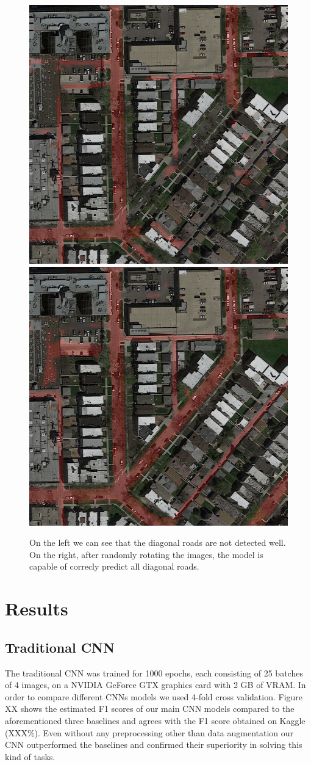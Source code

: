 \documentclass[10pt,conference,compsocconf]{IEEEtran}
\begin{document}
\begin{figure}[h]
 \centering
 \includegraphics[width=0.35\columnwidth]{img/diagonals.png}
 \includegraphics[width=0.35\columnwidth]{img/diagonals_corrected.png}
 \caption{On the left we can see that the diagonal roads are not detected well. On the right, after randomly rotating the images, the model is capable of correcly predict all diagonal roads.}
 \vspace{-3mm}
 \label{fig:diagonal}
\end{figure}

\section{Results}
\label{sec:results}
\subsection{Traditional CNN}
	The traditional CNN was trained for 1000 epochs, each consisting of 25 batches of 4 images, on a NVIDIA GeForce GTX graphics card with 2 GB of VRAM.
	In order to compare different CNNs models we used 4-fold cross validation. Figure XX shows the estimated F1 scores of our main CNN models compared to the aforementioned three baselines and agrees with the F1 score obtained on Kaggle (XXX\%). Even without any preprocessing other than data augmentation our CNN outperformed the baselines and confirmed their superiority in solving this kind of tasks.
\end{document}
